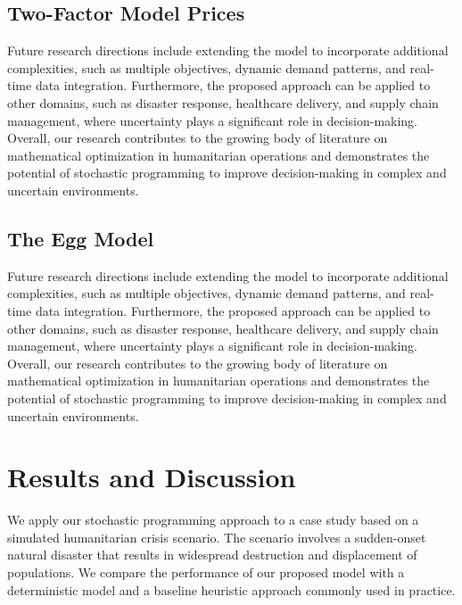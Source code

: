 \documentclass[deca,sglanonrev]{informs4}
\begin{document}
\subsection{Two-Factor Model Prices}\label{sec:MDF}
Future research directions include extending the model to incorporate additional complexities, such as multiple objectives, dynamic demand patterns, and real-time data integration. Furthermore, the proposed approach can be applied to other domains, such as disaster response, healthcare delivery, and supply chain management, where uncertainty plays a significant role in decision-making. Overall, our research contributes to the growing body of literature on mathematical optimization in humanitarian operations and demonstrates the potential of stochastic programming to improve decision-making in complex and uncertain environments.

\subsection{The Egg Model}\label{sec:EGG}
Future research directions include extending the model to incorporate additional complexities, such as multiple objectives, dynamic demand patterns, and real-time data integration. Furthermore, the proposed approach can be applied to other domains, such as disaster response, healthcare delivery, and supply chain management, where uncertainty plays a significant role in decision-making. Overall, our research contributes to the growing body of literature on mathematical optimization in humanitarian operations and demonstrates the potential of stochastic programming to improve decision-making in complex and uncertain environments.

\section{Results and Discussion}\label{sec:Results}
We apply our stochastic programming approach to a case study based on a simulated humanitarian crisis scenario. The scenario involves a sudden-onset natural disaster that results in widespread destruction and displacement of populations. We compare the performance of our proposed model with a deterministic model and a baseline heuristic approach commonly used in practice.
\end{document}
